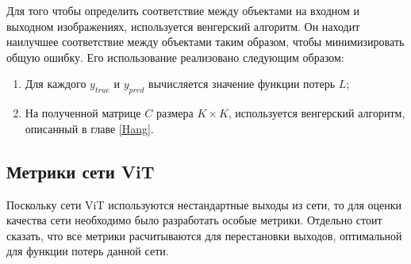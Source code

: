 \documentclass[14pt,a4paper]{extarticle}
\begin{document}
Для того чтобы определить соответствие между объектами на входном и выходном изображениях, используется венгерский алгоритм. Он находит наилучшее соответствие между объектами таким образом, чтобы минимизировать общую ошибку.
Его использование реализовано следующим образом:
\begin{enumerate}
\item Для каждого $y_{true}$ и $y_{pred}$ вычисляется значение функции потерь $L$;
\item На полученной матрице $C$ размера $K \times K$, используется венгерский алгоритм, описанный в главе \ref{Hang}.
\end{enumerate}

\newpage
\subsection{Метрики сети ViT}
Поскольку сети ViT используются нестандартные выходы из сети, то для оценки качества сети необходимо было разработать особые метрики. Отдельно стоит сказать, что все метрики расчитываются для перестановки выходов, оптимальной для функции потерь данной сети.
\end{document}
